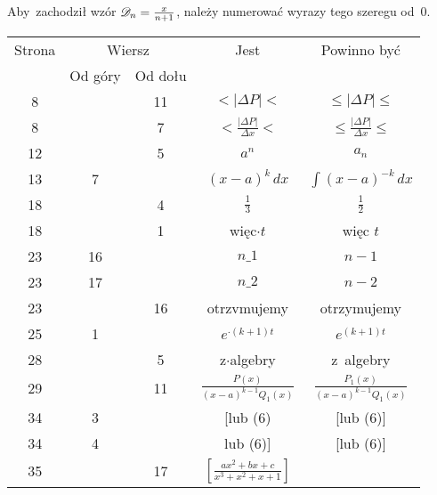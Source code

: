 \documentclass[a4paper,11pt]{article}
\begin{document}
\vspace{\spaceFour}





\noindent
{} Aby~zachodził wzór $\mathcal{D}_{ n } = \tfrac{ x }{ n + 1 }$,
należy numerować wyrazy tego szeregu od~0.

\vspace{\spaceFour}





\newpage



\begin{center}

  \begin{tabular}{|c|c|c|c|c|}
    \hline
    Strona & \multicolumn{2}{c|}{Wiersz} & Jest
                              & Powinno być \\ \cline{2-3}
    & Od góry & Od dołu & & \\
    \hline
    8   & & 11 & $< | \Delta P | <$ & $\leq | \Delta P | \leq$ \\[0.2em]
    8   & &  7 & $< \frac{ | \Delta P | }{ \Delta x } <$
           & $\leq \frac{ | \Delta P | }{ \Delta x } \leq$ \\[0.2em]
    12  & &  5 & $a^{ n }$ & $a_{ n }$ \\
    13  &  7 & & $( x - a )^{ k } \, dx$ & $\int ( x - a )^{ -k } \, dx$ \\
    18  & &  4 & $\frac{ 1 }{ 3 }$ & $\frac{ 1 }{ 2 }$ \\
    18  & &  1 & więc$\cdot t$ & więc $t$ \\
    23  & 16 & & $n \_ 1$ & $n - 1$ \\
    23  & 17 & & $n \_ 2$ & $n - 2$ \\
    23  & & 16 & otrzvmujemy & otrzymujemy \\
    25  &  1 & & $e^{ \cdot ( k + 1 ) t}$ & $e^{ ( k + 1 ) t}$ \\
    28  & &  5 & z$\cdot$algebry & z~algebry \\[0.2em]
    29  & & 11 & $\frac{ P( x ) }{ ( x - a )^{ k - 1 } Q_{ 1 }( x ) }$
           & $\frac{ P_{ 1 }( x ) }{ ( x - a )^{ k - 1 } Q_{ 1 }( x ) }$ \\
    34  &  3 & & [lub (6) & [lub (6)] \\
    34  &  4 & & lub (6)] & [lub (6)] \\
    35  & & 17 & $\left[ \frac{ a x^{ 2 } + b x + c }
                 { x^{ 3 } + x^{ 2 } + x + 1 } \right]$

\end{tabular}
\end{center}
\end{document}
